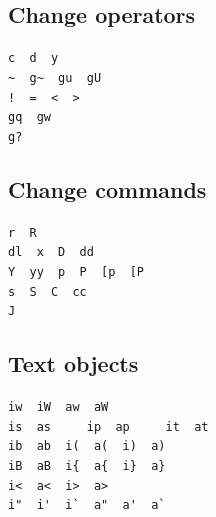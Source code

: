 \documentclass[14pt,svgnames,compress]{beamer}
\newcommand\framesubtitlefontsize{\huge}
\newcommand\singleframesubtitle[1]{
    \begin{center}
        \framesubtitlefontsize #1
    \end{center}
}
\newcommand\subtitleframe{
    \begin{frame}
        \singleframesubtitle{\insertsubsectionhead}
    \end{frame}
}
\begin{document}
\subsection{Change operators}

\subtitleframe

\begin{frame}[fragile]
    \begin{spacing}{1.5} %
        \Large
        \centering
        \verb|c  d  y| \\
        \verb|~  g~  gu  gU| \\
        \verb|!  =  <  >| \\
        \verb|gq  gw| \\
        \verb|g?|
    \end{spacing}
\end{frame}


\subsection{Change commands}

\subtitleframe

\begin{frame}[fragile]
    \begin{spacing}{1.5} %
        \Large
        \centering
        \verb|r  R| \\
        \verb|dl  x  D  dd| \\
        \verb|Y  yy  p  P  [p  [P| \\
        \verb|s  S  C  cc| \\
        \verb|J| \\
    \end{spacing}
\end{frame}

\subsection{Text objects}

\subtitleframe

\begin{frame}[fragile]
    \begin{spacing}{1.5} %
        \Large
        \centering
        \verb|iw  iW  aw  aW| \\
        \verb|is  as     ip  ap     it  at| \\
        \verb|ib  ab  i(  a(  i)  a)| \\
        \verb|iB  aB  i{  a{  i}  a}| \\
        \verb|i<  a<  i>  a>| \\
        \verb|i"  i'  i`  a"  a'  a`|
    \end{spacing}
\end{frame}
\end{document}
